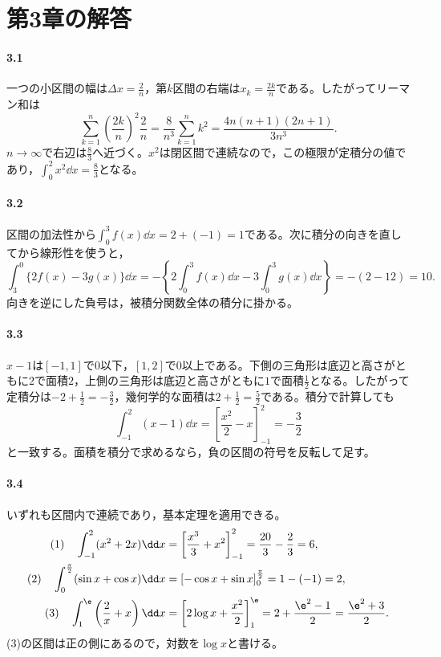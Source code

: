 \section{第3章の解答}\label{解答:第3章}

\paragraph{3.1}
一つの小区間の幅は$\Delta x=\frac2n$，第$k$区間の右端は$x_k=\frac{2k}{n}$である。したがってリーマン和は
\[
 \sum_{k=1}^n\left(\frac{2k}{n}\right)^2\frac2n
 =\frac8{n^3}\sum_{k=1}^nk^2
 =\frac{4n(n+1)(2n+1)}{3n^3}.
\]
$n\to\infty$で右辺は$\frac83$へ近づく。$x^2$は閉区間で連続なので，この極限が定積分の値であり，$\int_0^2x^2\dd x=\frac83$となる。

\paragraph{3.2}
区間の加法性から$\int_0^3f(x)\dd x=2+(-1)=1$である。次に積分の向きを直してから線形性を使うと，
\[
 \int_3^0\{2f(x)-3g(x)\}\dd x
 =-\left\{2\int_0^3f(x)\dd x-3\int_0^3g(x)\dd x\right\}
 =-(2-12)=10.
\]
向きを逆にした負号は，被積分関数全体の積分に掛かる。

\paragraph{3.3}
$x-1$は$[-1,1]$で$0$以下，$[1,2]$で$0$以上である。下側の三角形は底辺と高さがともに$2$で面積$2$，上側の三角形は底辺と高さがともに$1$で面積$\frac12$となる。したがって定積分は$-2+\frac12=-\frac32$，幾何学的な面積は$2+\frac12=\frac52$である。積分で計算しても
\[
 \int_{-1}^{2}(x-1)\dd x
 =\left[\frac{x^2}{2}-x\right]_{-1}^{2}=-\frac32
\]
と一致する。面積を積分で求めるなら，負の区間の符号を反転して足す。

\paragraph{3.4}
いずれも区間内で連続であり，基本定理を適用できる。
\begin{align*}
 \text{(1)}\quad\int_{-1}^2(x^2+2x)\dd x
 &=\left[\frac{x^3}{3}+x^2\right]_{-1}^2
 =\frac{20}{3}-\frac23=6,\\
 \text{(2)}\quad\int_0^{\frac\pi2}(\sin x+\cos x)\dd x
 &=[-\cos x+\sin x]_0^{\frac\pi2}=1-(-1)=2,\\
 \text{(3)}\quad\int_1^{\e}\left(\frac2x+x\right)\dd x
 &=\left[2\log x+\frac{x^2}{2}\right]_1^{\e}
 =2+\frac{\e^2-1}{2}=\frac{\e^2+3}{2}.
\end{align*}
(3)の区間は正の側にあるので，対数を$\log x$と書ける。

